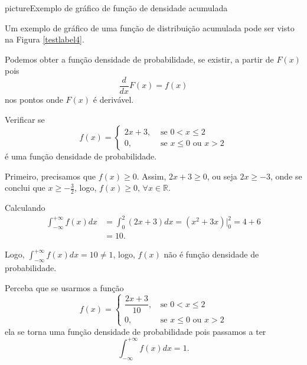 \begin{sidepicture}{0cm}{picture}{Exemplo de gráfico de função de densidade acumulada}
	\label{testlabel4}
\end{sidepicture}

Um exemplo de gráfico de uma função de distribuição acumulada pode ser visto na Figura \ref{testlabel4}.

\begin{remark}
	Podemos obter a função densidade de probabilidade, se existir, a partir de $F(x)$ pois
	\[
		\frac{d}{dx}F(x) = f(x)
	\]
	nos pontos onde $F(x)$ é derivável.
\end{remark}

\begin{example}
	Verificar se
	\[
		f(x)= \begin{cases}
			2x+3, &\text{ se } 0<x\leqslant 2\\
			0, &\text{ se } x \leqslant 0 \text{ ou } x > 2
		\end{cases}
	\]
	é uma função densidade de probabilidade.
	
	Primeiro, precisamos que  $f(x)\geqslant 0$. Assim, $2x+3\geqslant 0$, ou seja $2x\geqslant -3$, onde se conclui que $x \geqslant -\frac{3}{2}$, logo, $f(x)\geqslant 0$, $\forall x\in \mathbb{R}$.
	
	Calculando
	\begin{align*}
		\int_{-\infty}^{+\infty} f(x) dx &= \int_{0}^{2} (2x + 3)dx = (x^2+3x)\Big|_{0}^{2} = 4 + 6\\
										  &= 10\text{.}
	\end{align*}
	
	Logo, $\displaystyle \int_{-\infty}^{+\infty} f(x)dx = 10 \neq 1$, logo, $f(x)$ não é função densidade de probabilidade.
\end{example}

\begin{remark}
	Perceba que se usarmos a função
	\[
		f(x)=\begin{cases}
			\dfrac{2x+3}{10}\text{,} &\text{ se } 0<x\leqslant 2\\
			0\text{,} & \text{ se } x\leqslant 0\text{ ou }x>2
		\end{cases}
	\]
	ela se torna uma função densidade de probabilidade pois passamos a ter
	\[
		\int_{-\infty}^{+\infty} f(x)dx = 1
		\text{.}
	\]
\end{remark}

